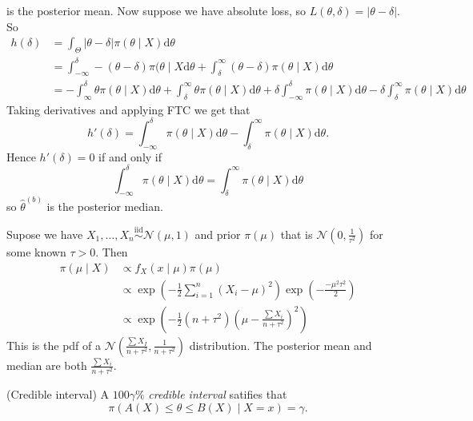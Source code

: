 \documentclass{article}
\newcommand{\iid}{\overset{\text{iid}}{\sim}}
\begin{document}
is the posterior mean. Now suppose we have absolute loss, so $ L(\theta,\delta) = |\theta- \delta| $. So
\begin{align*}
	h(\delta) &= \int_\Theta |\theta-\delta|\pi(\theta\mid X)\mathrm d\theta\\
		  &= \int_{-\infty}^\delta -(\theta-\delta)\pi(\theta\mid X\mathrm d\theta + \int_\delta^\infty (\theta-\delta)\pi(\theta\mid X)\mathrm d\theta\\
		  &= -\int_\infty^\delta \theta\pi(\theta\mid X)\mathrm d\theta + \int_\delta^\infty \theta\pi(\theta \mid X)\mathrm d\theta + \delta\int_{-\infty}^\delta \pi(\theta\mid X)\mathrm d\theta - \delta\int_\delta^\infty \pi(\theta\mid X)\mathrm d\theta
\end{align*}
Taking derivatives and applying FTC we get that
\[
	h'(\delta) = \int_{-\infty}^\delta \pi(\theta\mid X)\mathrm d\theta - \int_{\delta}^\infty \pi(\theta\mid X)\mathrm d\theta.
\]
Hence $ h'(\delta) = 0 $ if and only if 
\[
	\int_{-\infty}^\delta \pi(\theta\mid X)\mathrm d\theta = \int_{\delta}^\infty \pi(\theta\mid X)\mathrm d\theta
\]
so $ \hat \theta^{(b)} $ is the posterior median.
\par
Supose we have $ X_1,\dots , X_n\iid \mathcal N(\mu, 1) $ and prior $ \pi(\mu) $ that is $ \mathcal N(0,\frac 1{\tau^2}) $ for some known $ \tau>0 $. Then
\begin{align*}
	\pi(\mu \mid X) &\propto f_X(x\mid \mu)\pi(\mu)\\
			&\propto \exp\left(-\frac 12 \sum_{i=1}^n (X_i-\mu)^2\right)\exp\left(-\frac{-\mu^2 \tau^2}{2}\right)\\
			&\propto \exp\left(-\frac 12 (n+\tau^2)\left(\mu - \frac{\sum X_i}{n+\tau^2}\right)^2\right)
\end{align*}
This is the pdf of a $\mathcal N\left(\frac{\sum X_I}{n+\tau^2}, \frac 1{n+\tau^2}\right) $ distribution. The posterior mean and median are both $ \frac{\sum X_i}{n+\tau^2} $.
\begin{definition}
	(Credible interval) A $ 100\gamma\% $ \textit{credible interval} satifies that
	\[
	  \pi(A(X)\le \theta\le B(X)\mid X=x) = \gamma.
	\]
\end{definition}
\end{document}
